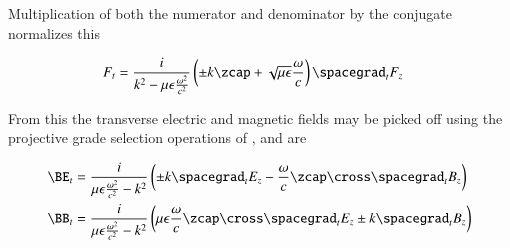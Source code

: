 Multiplication of both the numerator and denominator by the conjugate normalizes this

\begin{equation}\label{eqn:transverseField:summaryTransverseBoth}
\begin{aligned}
F_t &= \frac{i}{k^2 - \mu\epsilon\frac{\omega^2}{c^2}} \left( \pm k \zcap + \sqrt{\mu\epsilon}\frac{\omega}{c}\right) \spacegrad_t F_z
\end{aligned}
\end{equation}

From this the transverse electric and magnetic fields may be picked off using the projective grade selection operations of , and are

\begin{equation}\label{eqn:transverseField:SummaryTransversePair}
\begin{aligned}
\BE_t &= \frac{i}{\mu\epsilon\frac{\omega^2}{c^2} -k^2} \left( \pm k \spacegrad_t E_z - \frac{\omega}{c} \zcap \cross \spacegrad_t B_z \right) \\
\BB_t &= \frac{i}{\mu\epsilon\frac{\omega^2}{c^2} -k^2} \left( {\mu\epsilon}\frac{\omega}{c} \zcap \cross \spacegrad_t E_z \pm k \spacegrad_t B_z \right)
\end{aligned}
\end{equation}
